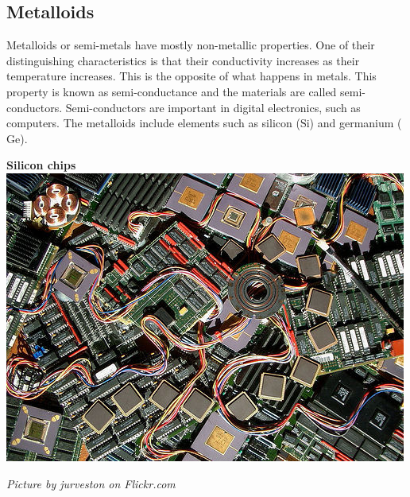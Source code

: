             \subsection*{Metalloids}
            \nopagebreak
\begin{minipage}{.5\textwidth}
        \label{m38708*id66042}Metalloids or semi-metals have mostly non-metallic properties. One of their distinguishing characteristics is that their conductivity increases as their temperature increases. This is the opposite of what happens in metals. This property is known as semi-conductance and the materials are called semi-conductors. Semi-conductors are important in digital electronics, such as computers. The metalloids include elements such as silicon ($\text{Si}$) and germanium ($\text{Ge}$).\par 
\end{minipage}
\begin{minipage}{.5\textwidth}
\begin{center}
\textbf{Silicon chips}\\
 \includegraphics[width=.6\textwidth]{photos/siliconby-jurveston.jpg}\par
\textit{Picture by jurveston on Flickr.com}
\end{center}
\end{minipage}
\par \label{m38708*eip-586} 
      \noindent
